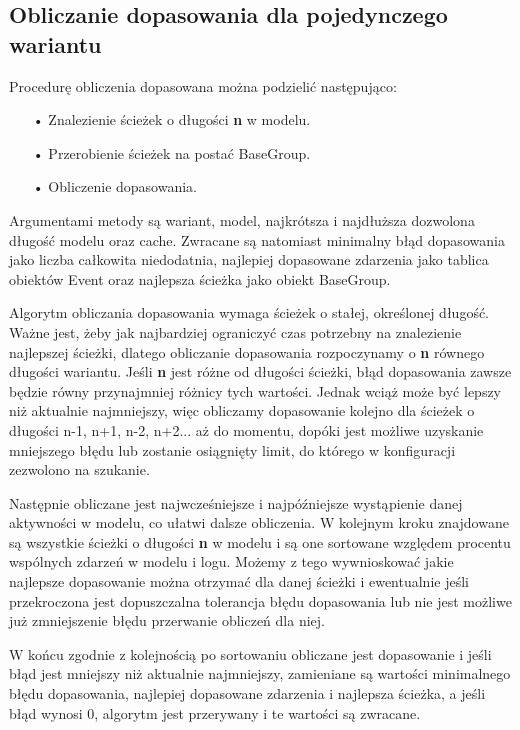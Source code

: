 \subsection{Obliczanie dopasowania dla pojedynczego wariantu}
Procedurę obliczenia dopasowana można podzielić następująco:
\begin{itemize}
  \item[•] Znalezienie ścieżek o długości \textbf{n} w modelu.
  \item[•] Przerobienie ścieżek na postać BaseGroup.
  \item[•] Obliczenie dopasowania.
\end{itemize}

Argumentami metody są wariant, model, najkrótsza i najdłuższa dozwolona długość modelu oraz cache. Zwracane są natomiast minimalny błąd dopasowania jako liczba całkowita niedodatnia, najlepiej dopasowane zdarzenia jako tablica obiektów Event oraz najlepsza ścieżka jako obiekt BaseGroup.

Algorytm obliczania dopasowania wymaga ścieżek o stałej, określonej długość. Ważne jest, żeby jak najbardziej ograniczyć czas potrzebny na znalezienie najlepszej ścieżki, dlatego obliczanie dopasowania rozpoczynamy o \textbf{n} równego długości wariantu. Jeśli \textbf{n} jest różne od długości ścieżki, błąd dopasowania zawsze będzie równy przynajmniej różnicy tych wartości. Jednak wciąż może być lepszy niż aktualnie najmniejszy, więc obliczamy dopasowanie kolejno dla ścieżek o długości n-1, n+1, n-2, n+2... aż do momentu, dopóki jest możliwe uzyskanie mniejszego błędu lub zostanie osiągnięty limit, do którego w konfiguracji zezwolono na szukanie. 

Następnie obliczane jest najwcześniejsze i najpóźniejsze wystąpienie danej aktywności w modelu, co ułatwi dalsze obliczenia. W kolejnym kroku znajdowane są wszystkie ścieżki o długości \textbf{n} w modelu i są one sortowane względem procentu wspólnych zdarzeń w modelu i logu. Możemy z tego wywnioskować jakie najlepsze dopasowanie można otrzymać dla danej ścieżki i ewentualnie jeśli przekroczona jest dopuszczalna tolerancja błędu dopasowania lub nie jest możliwe już zmniejszenie błędu przerwanie obliczeń dla niej.    

W końcu zgodnie z kolejnością po sortowaniu obliczane jest dopasowanie i jeśli błąd jest mniejszy niż aktualnie najmniejszy, zamieniane są wartości minimalnego błędu dopasowania, najlepiej dopasowane zdarzenia i najlepsza ścieżka, a jeśli błąd wynosi 0, algorytm jest przerywany i te wartości są zwracane.

